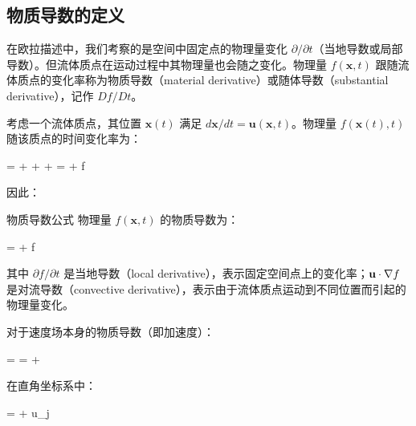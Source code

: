 \subsection{物质导数的定义}

在欧拉描述中，我们考察的是空间中固定点的物理量变化 \(\partial/\partial t\)（当地导数或局部导数）。但流体质点在运动过程中其物理量也会随之变化。物理量 \(f(\mathbf{x},t)\) 跟随流体质点的变化率称为物质导数（material derivative）或随体导数（substantial derivative），记作 \(Df/Dt\)。

考虑一个流体质点，其位置 \(\mathbf{x}(t)\) 满足 \(d\mathbf{x}/dt = \mathbf{u}(\mathbf{x},t)\)。物理量 \(f(\mathbf{x}(t), t)\) 随该质点的时间变化率为：

\begin{myformula}
 =  +  +  +  =  + \cdot\Nabla f
\end{myformula}

因此：

\begin{myTheorem}{物质导数公式}
物理量 \(f(\mathbf{x},t)\) 的物质导数为：
\begin{myformula}
 =  + \cdot\Nabla f
\end{myformula}
其中 \(\partial f/\partial t\) 是当地导数（local derivative），表示固定空间点上的变化率；\(\mathbf{u}\cdot\nabla f\) 是对流导数（convective derivative），表示由于流体质点运动到不同位置而引起的物理量变化。
\end{myTheorem}

对于速度场本身的物质导数（即加速度）：

\begin{myformula}
 =  =  + \cdot\Nabla {}
\end{myformula}

在直角坐标系中：
\begin{myformula}
 =  + u_j 
\end{myformula}

